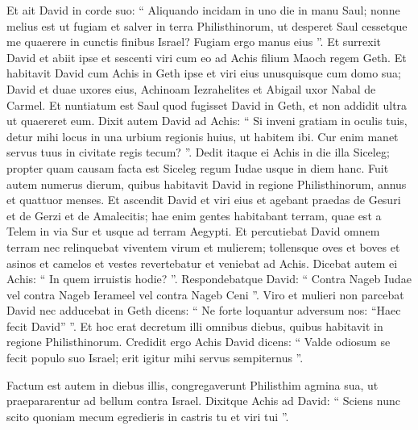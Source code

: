 \begin{biblechapter}
\begin{biblechapter}
\begin{biblechapter}
\begin{biblechapter}
\begin{biblechapter}
\begin{biblechapter}
\begin{biblechapter}
\begin{biblechapter}
\begin{biblechapter}
\begin{biblechapter}
\begin{biblechapter}
\begin{biblechapter}
\begin{biblechapter}
\begin{biblechapter}
\begin{biblechapter}
\begin{biblechapter}
\begin{biblechapter}
\begin{biblechapter}
\begin{biblechapter}
\begin{biblechapter}
\begin{biblechapter}
\begin{biblechapter}
\begin{biblechapter}
\begin{biblechapter}
\begin{biblechapter}
\begin{biblechapter}
\begin{biblechapter}
\verse Et ait David in corde suo: “ Aliquando incidam in uno die in manu Saul; nonne melius est ut fugiam et salver in terra Philisthinorum, ut desperet Saul cessetque me quaerere in cunctis finibus Israel? Fugiam ergo manus eius ”. 
\verse Et surrexit David et abiit ipse et sescenti viri cum eo ad Achis filium Maoch regem Geth. 
\verse Et habitavit David cum Achis in Geth ipse et viri eius unusquisque cum domo sua; David et duae uxores eius, Achinoam Iezrahelites et Abigail uxor Nabal de Carmel. 
\verse Et nuntiatum est Saul quod fugisset David in Geth, et non addidit ultra ut quaereret eum.
 \verse Dixit autem David ad Achis: “ Si inveni gratiam in oculis tuis, detur mihi locus in una urbium regionis huius, ut habitem ibi. Cur enim manet servus tuus in civitate regis tecum? ”. 
\verse Dedit itaque ei Achis in die illa Siceleg; propter quam causam facta est Siceleg regum Iudae usque in diem hanc. 
\verse Fuit autem numerus dierum, quibus habitavit David in regione Philisthinorum, annus et quattuor menses.
 \verse Et ascendit David et viri eius et agebant praedas de Gesuri et de Gerzi et de Amalecitis; hae enim gentes habitabant terram, quae est a Telem in via Sur et usque ad terram Aegypti. 
\verse Et percutiebat David omnem terram nec relinquebat viventem virum et mulierem; tollensque oves et boves et asinos et camelos et vestes revertebatur et veniebat ad Achis. 
\verse Dicebat autem ei Achis: “ In quem irruistis hodie? ”. Respondebatque David: “ Contra Nageb Iudae vel contra Nageb Ierameel vel contra Nageb Ceni ”. 
\verse Viro et mulieri non parcebat David nec adducebat in Geth dicens: “ Ne forte loquantur adversum nos: “Haec fecit David” ”. Et hoc erat decretum illi omnibus diebus, quibus habitavit in regione Philisthinorum. 
\verse Credidit ergo Achis David dicens: “ Valde odiosum se fecit populo suo Israel; erit
 igitur mihi servus sempiternus ”. 
\begin{biblechapter}
\verse Factum est autem in diebus illis, congregaverunt Philisthim agmina sua, ut praepararentur ad bellum contra Israel. Dixitque Achis ad David: “ Sciens nunc scito quoniam mecum egredieris in castris tu et viri tui ”. 

\end{biblechapter}
\end{biblechapter}
\end{biblechapter}
\end{biblechapter}
\end{biblechapter}
\end{biblechapter}
\end{biblechapter}
\end{biblechapter}
\end{biblechapter}
\end{biblechapter}
\end{biblechapter}
\end{biblechapter}
\end{biblechapter}
\end{biblechapter}
\end{biblechapter}
\end{biblechapter}
\end{biblechapter}
\end{biblechapter}
\end{biblechapter}
\end{biblechapter}
\end{biblechapter}
\end{biblechapter}
\end{biblechapter}
\end{biblechapter}
\end{biblechapter}
\end{biblechapter}
\end{biblechapter}
\end{biblechapter}
